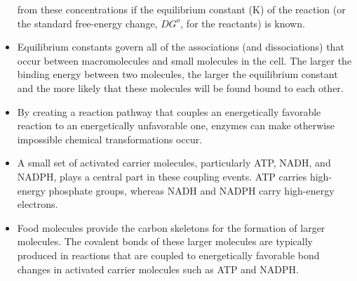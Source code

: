 \begin{itemize}
from these concentrations if the equilibrium constant (K) of the reaction
(or the standard free-energy change, $DG^{o}$, for the reactants) is
known.
\item Equilibrium constants govern all of the associations (and dissociations)
that occur between macromolecules and small molecules in
the cell. The larger the binding energy between two molecules, the
larger the equilibrium constant and the more likely that these molecules
will be found bound to each other.
\item By creating a reaction pathway that couples an energetically favorable
reaction to an energetically unfavorable one, enzymes can make
otherwise impossible chemical transformations occur.
\item A small set of activated carrier molecules, particularly ATP, NADH,
and NADPH, plays a central part in these coupling events. ATP carries
high-energy phosphate groups, whereas NADH and NADPH carry
high-energy electrons.
\item Food molecules provide the carbon skeletons for the formation of
larger molecules. The covalent bonds of these larger molecules are
typically produced in reactions that are coupled to energetically favorable
bond changes in activated carrier molecules such as ATP and NADPH.
\end{itemize}
